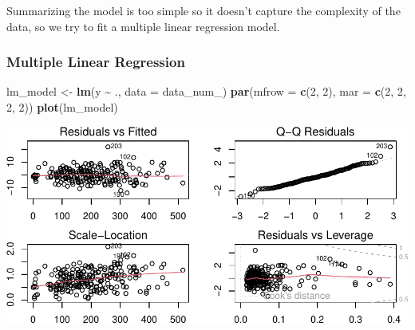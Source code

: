\documentclass[
]{article}
\newenvironment{Shaded}{\begin{snugshade}}{\end{snugshade}}
\newcommand{\AttributeTok}[1]{\textcolor[rgb]{0.13,0.29,0.53}{#1}}
\newcommand{\DecValTok}[1]{\textcolor[rgb]{0.00,0.00,0.81}{#1}}
\newcommand{\FunctionTok}[1]{\textcolor[rgb]{0.13,0.29,0.53}{\textbf{#1}}}
\newcommand{\NormalTok}[1]{#1}
\newcommand{\OtherTok}[1]{\textcolor[rgb]{0.56,0.35,0.01}{#1}}
\newcommand{\SpecialCharTok}[1]{\textcolor[rgb]{0.81,0.36,0.00}{\textbf{#1}}}
\newcommand{\StringTok}[1]{\textcolor[rgb]{0.31,0.60,0.02}{#1}}
\begin{document}
Summarizing the model is too simple so it doesn't capture the complexity
of the data, so we try to fit a multiple linear regression model.

\subsubsection{Multiple Linear
Regression}\label{multiple-linear-regression}

\begin{Shaded}
\begin{Highlighting}[]
\NormalTok{lm\_model }\OtherTok{\textless{}{-}} \FunctionTok{lm}\NormalTok{(y }\SpecialCharTok{\textasciitilde{}}\NormalTok{ ., }\AttributeTok{data =}\NormalTok{ data\_num\_)}
\FunctionTok{par}\NormalTok{(}\AttributeTok{mfrow =} \FunctionTok{c}\NormalTok{(}\DecValTok{2}\NormalTok{, }\DecValTok{2}\NormalTok{), }\AttributeTok{mar =} \FunctionTok{c}\NormalTok{(}\DecValTok{2}\NormalTok{, }\DecValTok{2}\NormalTok{, }\DecValTok{2}\NormalTok{, }\DecValTok{2}\NormalTok{))}
\FunctionTok{plot}\NormalTok{(lm\_model)}
\end{Highlighting}
\end{Shaded}

\begin{center}\includegraphics{Statistical_Learning_Final_Report_files/figure-latex/multiple_linear_regression-1} \end{center}

\begin{Shaded}
\end{Shaded}
\end{document}

